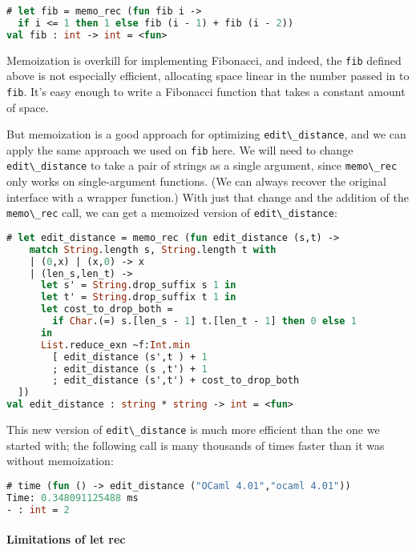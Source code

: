 \begin{lstlisting}[language=Caml]
# let fib = memo_rec (fun fib i ->
  if i <= 1 then 1 else fib (i - 1) + fib (i - 2))
val fib : int -> int = <fun>
\end{lstlisting}

Memoization is overkill for implementing Fibonacci, and indeed, the
\passthrough{\lstinline!fib!} defined above is not especially efficient,
allocating space linear in the number passed in to
\passthrough{\lstinline!fib!}. It's easy enough to write a Fibonacci
function that takes a constant amount of space.

But memoization is a good approach for optimizing
\passthrough{\lstinline!edit\_distance!}, and we can apply the same
approach we used on \passthrough{\lstinline!fib!} here. We will need to
change \passthrough{\lstinline!edit\_distance!} to take a pair of
strings as a single argument, since \passthrough{\lstinline!memo\_rec!}
only works on single-argument functions. (We can always recover the
original interface with a wrapper function.) With just that change and
the addition of the \passthrough{\lstinline!memo\_rec!} call, we can get
a memoized version of \passthrough{\lstinline!edit\_distance!}:

\begin{lstlisting}[language=Caml]
# let edit_distance = memo_rec (fun edit_distance (s,t) ->
    match String.length s, String.length t with
    | (0,x) | (x,0) -> x
    | (len_s,len_t) ->
      let s' = String.drop_suffix s 1 in
      let t' = String.drop_suffix t 1 in
      let cost_to_drop_both =
        if Char.(=) s.[len_s - 1] t.[len_t - 1] then 0 else 1
      in
      List.reduce_exn ~f:Int.min
        [ edit_distance (s',t ) + 1
        ; edit_distance (s ,t') + 1
        ; edit_distance (s',t') + cost_to_drop_both
  ])
val edit_distance : string * string -> int = <fun>
\end{lstlisting}

This new version of \passthrough{\lstinline!edit\_distance!} is much
more efficient than the one we started with; the following call is many
thousands of times faster than it was without memoization:

\begin{lstlisting}[language=Caml]
# time (fun () -> edit_distance ("OCaml 4.01","ocaml 4.01"))
Time: 0.348091125488 ms
- : int = 2
\end{lstlisting}

\hypertarget{limitations-of-let-rec}{%
\paragraph{Limitations of let rec}\label{limitations-of-let-rec}}

